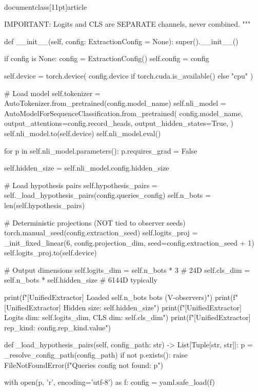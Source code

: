 \\documentclass[11pt]{article}
\begin{document}
\begin{CodeBlock}
    IMPORTANT: Logits and CLS are SEPARATE channels, never combined.
    """
    
    def __init__(self, config: ExtractionConfig = None):
        super().__init__()
        
        if config is None:
            config = ExtractionConfig()
        self.config = config
        
        self.device = torch.device(
            config.device if torch.cuda.is_available() else "cpu"
        )
        
        # Load model
        self.tokenizer = AutoTokenizer.from_pretrained(config.model_name)
        self.nli_model = AutoModelForSequenceClassification.from_pretrained(
            config.model_name,
            output_attentions=config.record_heads,
            output_hidden_states=True,
        )
        self.nli_model.to(self.device)
        self.nli_model.eval()
        
        for p in self.nli_model.parameters():
            p.requires_grad = False
        
        self.hidden_size = self.nli_model.config.hidden_size
        
        # Load hypothesis pairs
        self.hypothesis_pairs = self._load_hypothesis_pairs(config.queries_config)
        self.n_bots = len(self.hypothesis_pairs)
        
        # Deterministic projections (NOT tied to observer seeds)
        torch.manual_seed(config.extraction_seed)
        self.logits_proj = _init_fixed_linear(6, config.projection_dim, seed=config.extraction_seed + 1)
        self.logits_proj.to(self.device)
        
        # Output dimensions
        self.logits_dim = self.n_bots * 3  # 24D
        self.cls_dim = self.n_bots * self.hidden_size  # 6144D typically
        
        print(f"[UnifiedExtractor] Loaded {self.n_bots} bots (V-observers)")
        print(f"[UnifiedExtractor] Hidden size: {self.hidden_size}")
        print(f"[UnifiedExtractor] Logits dim: {self.logits_dim}, CLS dim: {self.cls_dim}")
        print(f"[UnifiedExtractor] rep_kind: {config.rep_kind.value}")
    
    def _load_hypothesis_pairs(self, config_path: str) -> List[Tuple[str, str]]:
        p = _resolve_config_path(config_path)
        if not p.exists():
            raise FileNotFoundError(f"Queries config not found: {p}")
        
        with open(p, 'r', encoding='utf-8') as f:
            config = yaml.safe_load(f)
        

\end{CodeBlock}
\end{document}
